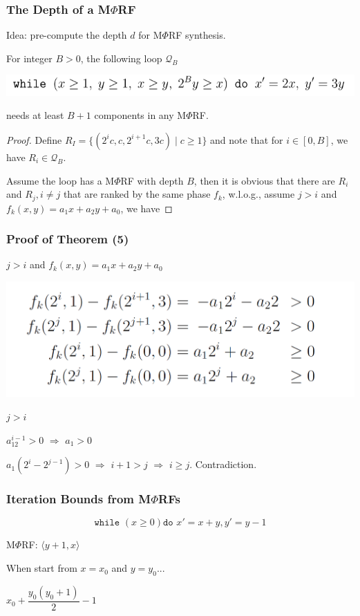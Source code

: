 \documentclass[11pt]{beamer}
\begin{document}
\begin{frame}\frametitle{The Depth of a M$\Phi$RF}
Idea: pre-compute the depth $d$ for M$\Phi$RF synthesis.

\begin{theorem}[5]
For integer $B > 0$, the following loop $\mathcal{Q}_B$
\begin{center}
\includegraphics[scale=0.5]{5.PNG}
\end{center}
needs at least $B + 1$ components in any M$\Phi$RF.
\end{theorem}

\begin{proof}
Define $R_I = \{(2^ic, c, 2^{i+1}c, 3c) \mid c \ge 1 \}$ and note that for $i \in [0,B]$, we have $R_i \in \mathcal{Q}_B$. 

Assume the loop has a M$\Phi$RF with depth $B$, then it is obvious that there are $R_i$ and $R_j, i\ne j$ that are ranked by the same phase $f_k$, w.l.o.g., assume $j > i$ and $f_k(x, y) = a_1 x + a_2 y + a_0$, we have 
 
\end{proof}

\end{frame}

\begin{frame}\frametitle{Proof of Theorem (5)}
$j > i$ and $f_k(x, y) = a_1 x + a_2 y + a_0$
\begin{center}
\includegraphics[scale = 0.3]{9.PNG}
\end{center}
$j > i$

$a_12^{i - 1} > 0$ $\Rightarrow$ $a_1 > 0$

$a_1 (2^{i} - 2^{j - 1}) > 0$ $\Rightarrow$ $i + 1 > j$ $\Rightarrow$ $i \ge j$. Contradiction.




\end{frame}

\begin{frame}\frametitle{Iteration Bounds from M$\Phi$RFs}
\begin{example}
\[\texttt{while }(x \ge 0)\texttt{do } x'= x + y, y' = y - 1\]
\end{example}
M$\Phi$RF: $\langle y + 1, x \rangle $

When start from $x = x_0$ and $y = y_0$...

$x_0 + \dfrac{y_0(y_0 + 1)}{2} - 1$
\end{frame}
\end{document}
